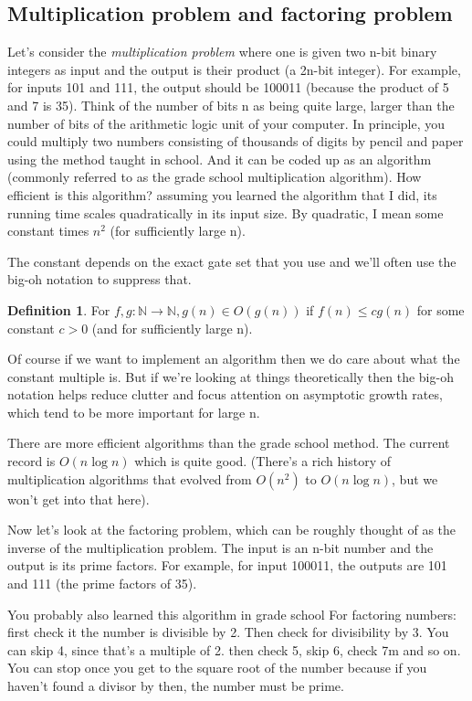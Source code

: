 \documentclass[12pt, oneside]{book}
\theoremstyle{definition}
\newtheorem{definition}{Definition}[section]
\theoremstyle{definition}
\theoremstyle{remark}
\begin{document}
\subsection{Multiplication problem and factoring problem}
Let's consider the \textit{multiplication problem} where one is given two n-bit binary integers as input and the output is their product (a 2n-bit integer). For example, for inputs 101 and 111, the output should be 100011 (because the product of 5 and 7 is 35).
Think of the number of bits n as being quite large, larger than the number of bits of the arithmetic logic unit of your computer. In principle, you could multiply two numbers consisting of thousands of digits by pencil and paper using the method taught in school. And it can be coded up as an algorithm (commonly referred to as the grade school multiplication algorithm). How efficient is this algorithm? assuming you learned the algorithm that I did, its running time scales quadratically in its input size. By quadratic, I mean some constant times $n^2$ (for sufficiently large n).

The constant depends on the exact gate set that you use and we'll often use the big-oh notation to suppress that.

\begin{definition}
    For $f,g:\mathbb{N}\rightarrow\mathbb{N}, g(n) \in O(g(n))$ if $f(n)\leq cg(n)$ for some constant $c > 0$ (and for sufficiently large n).
\end{definition}
Of course if we want to implement an algorithm then we do care about what the constant multiple is. But if we're looking at things theoretically then the big-oh notation helps reduce clutter and focus attention on asymptotic growth rates, which tend to be more important for large n.

There are more efficient algorithms than the grade school method. The current record is $O(n \log n)$ which is quite good. (There's a rich history of multiplication algorithms that evolved from $O(n^2)$ to $O(n \log n)$, but we won't get into that here).

Now let's look at the factoring problem, which can be roughly thought of as the inverse of the multiplication problem. The input is an n-bit number and the output is its prime factors. For example, for input 100011, the outputs are 101 and 111 (the prime factors of 35).

You probably also learned this algorithm in grade school For factoring numbers: first check it the number is divisible by 2. Then check for divisibility by 3. You can skip 4, since that's a multiple of 2. then check 5, skip 6, check 7m and so on. You can stop once you get to the square root of the number because if you haven't found a divisor by then, the number must be prime.
\end{document}
